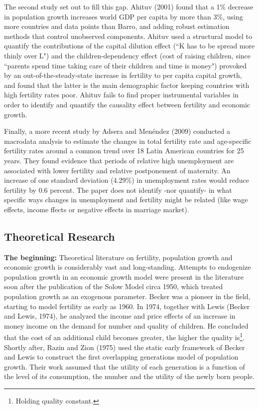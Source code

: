 \documentclass[12pt]{article}%
\begin{document}
The second study set out to fill this gap. Ahituv (2001) found that a 1\% decrease in population growth increases world GDP per capita by more than 3\%, using more countries and data points than Barro, and adding robust estimation methods that control unobserved components. Ahituv used a structural model to quantify the contributions of the capital dilution effect (``K has to be spread more thinly over L") and the children-dependency effect (cost of raising children, since ``parents spend time taking care of their children and time is money") provoked by an out-of-the-steady-state increase in fertility to per capita capital growth, and found that the latter is the main demographic factor keeping countries with high fertility rates poor. Ahituv fails to find proper instrumental variables in order to identify and quantify the causality effect between fertility and economic growth.

Finally, a more recent study by Adsera and Men\'endez (2009) conducted a macrodata analysis to estimate the changes in total fertility rate and age-specific fertility rates around a common trend over 18 Latin American countries for 25 years. They found evidence that periods of relative high unemployment are associated with lower fertility and relative postponement of maternity.  An increase of one standard deviation (4.29\%) in unemployment rates would reduce fertility by 0.6 percent. The paper does not identify -nor quantify- in what specific ways changes in unemployment and fertility might be related (like wage effects, income ffects or negative effects in marriage market).
\subsection{Theoretical Research}
\textbf{The beginning:} Theoretical literature on fertility, population growth and economic growth is considerably vast and long-standing. Attempts to endogenize population growth in an economic growth model were present in the literature soon after the publication of the Solow Model circa 1950, which treated population growth as an exogenous parameter. Becker was a pioneer in the field, starting to model fertility as early as 1960. In 1974, together with Lewis (Becker and Lewis, 1974), he analyzed the income and price effects of an increase in money income on the demand for number and quality of children. He concluded that the cost of an additional child becomes greater, the higher the quality is\footnote{Holding quality constant.}. Shortly after, Razin and Zion (1975) used the static early framework of Becker and Lewis to construct the first overlapping generations model of population growth. Their work assumed that the utility of each generation is a function of the level of its consumption, the number and the utility of the newly born people.
\end{document}
